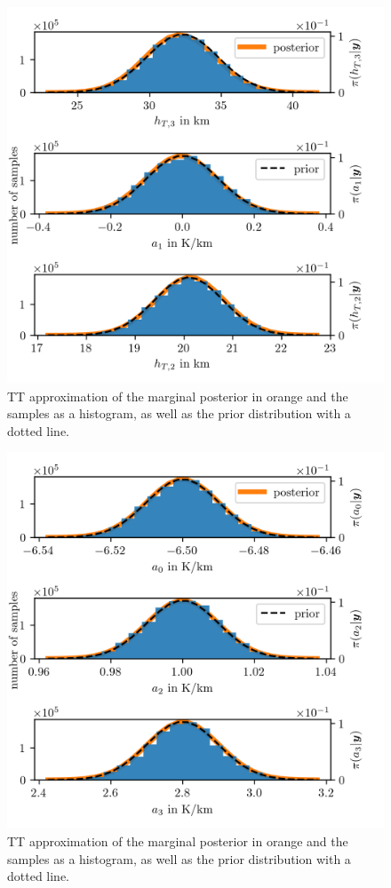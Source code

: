 \begin{figure}[ht!]
	\centering
	\includegraphics{PHdPTPost2.png}
	\caption[Histograms and TT approximation of posterior distribution as well as hyper-prior distribution.]{TT approximation of the marginal posterior in orange and the samples as a histogram, as well as the prior distribution with a dotted line.}
	\label{fig:PostHistTT2}
\end{figure}
\begin{figure}[ht!]
	\centering
	\includegraphics{PHdPTPost3.png}
	\caption[Histograms and TT approximation of posterior distribution as well as hyper-prior distribution.]{TT approximation of the marginal posterior in orange and the samples as a histogram, as well as the prior distribution with a dotted line.}
	\label{fig:PostHistTT3}
\end{figure}
